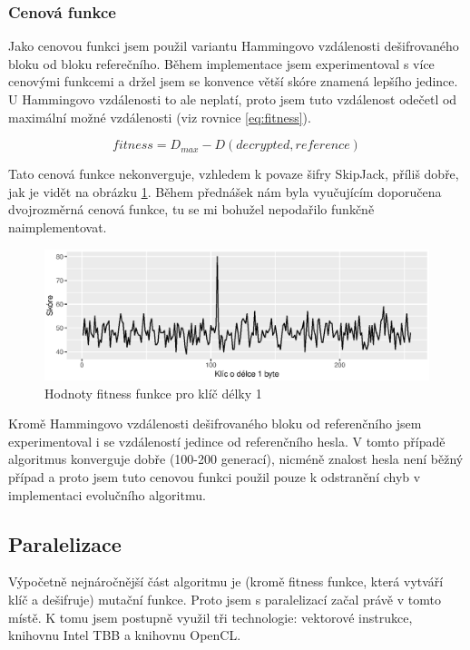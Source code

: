 \documentclass[11pt,a4paper]{scrartcl}
\begin{document}
	\subsubsection{Cenová funkce}
	Jako cenovou funkci jsem použil variantu Hammingovo vzdálenosti dešifrovaného bloku od bloku referečního. Během implementace jsem experimentoval s více cenovými funkcemi a držel jsem se konvence větší skóre znamená lepšího jedince. U Hammingovo vzdálenosti to ale neplatí, proto jsem tuto vzdálenost odečetl od maximální možné vzdálenosti (viz rovnice \ref{eq:fitness}).
	
	\begin{equation}
		fitness = D_{max} - D(decrypted,reference)
		\label{eq:fitness}
	\end{equation}
	
	Tato cenová funkce nekonverguje, vzhledem k povaze šifry SkipJack, příliš dobře, jak je vidět na obrázku \ref{fig:fitness-chart}. Během přednášek nám byla vyučujícím doporučena dvojrozměrná cenová funkce, tu se mi bohužel nepodařilo funkčně naimplementovat.
	
	\begin{figure}[!h]
		\centering
		\includegraphics[width=15cm]{img/fitness-plot}
		\caption{Hodnoty fitness funkce pro klíč délky 1}
		\label{fig:fitness-chart}
	\end{figure}

	Kromě Hammingovo vzdálenosti dešifrovaného bloku od referenčního jsem experimentoval i se vzdáleností jedince od referenčního hesla. V tomto případě algoritmus konverguje dobře (100-200 generací), nicméně znalost hesla není běžný případ a proto jsem tuto cenovou funkci použil pouze k odstranění chyb v implementaci evolučního algoritmu.
	
	
	\subsection{Paralelizace}
	Výpočetně nejnáročnější část algoritmu je (kromě fitness funkce, která vytváří klíč a dešifruje) mutační funkce. Proto jsem s paralelizací začal právě v tomto místě. K tomu jsem postupně využil tři technologie: vektorové instrukce, knihovnu Intel TBB a knihovnu OpenCL. 
	
\end{document}
